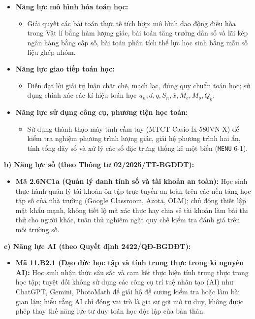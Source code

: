 \documentclass[12pt, a4paper]{article}
\begin{document}
\begin{itemize}[leftmargin=1.5em]
\begin{itemize}
        \item Tính toán chính xác các số đặc trưng đo xu thế trung tâm của mẫu số liệu ghép nhóm; đọc hiểu và nhận xét bảng số liệu thực tế.
        \item Rèn luyện kĩ năng phân bổ thời gian hợp lí khi làm bài kiểm tra trắc nghiệm kết hợp tự luận (tỉ lệ 70\% trắc nghiệm khách quan, 30\% tự luận).
    \end{itemize}
    \item \textbf{Năng lực mô hình hóa toán học:}
    \begin{itemize}
        \item Giải quyết các bài toán thực tế tích hợp: mô hình dao động điều hòa trong Vật lí bằng hàm lượng giác, bài toán tăng trưởng dân số và lãi kép ngân hàng bằng cấp số, bài toán phân tích thể lực học sinh bằng mẫu số liệu ghép nhóm.
    \end{itemize}
    \item \textbf{Năng lực giao tiếp toán học:}
    \begin{itemize}
        \item Diễn đạt lời giải tự luận chặt chẽ, mạch lạc, đúng quy chuẩn toán học; sử dụng chính xác các kí hiệu toán học $u_n, d, q, S_n, \overline{x}, M_e, M_o, Q_k$.
    \end{itemize}
    \item \textbf{Năng lực sử dụng công cụ, phương tiện học toán:}
    \begin{itemize}
        \item Sử dụng thành thạo máy tính cầm tay (MTCT Casio fx-580VN X) để kiểm tra nghiệm phương trình lượng giác, giải hệ phương trình hai ẩn, tính tổng dãy số và xử lý các số đặc trưng thống kê một biến (\texttt{MENU} 6-1).
    \end{itemize}
\end{itemize}

\textbf{b) Năng lực số (theo Thông tư 02/2025/TT-BGDĐT):}
\begin{itemize}[leftmargin=1.5em]
    \item \textbf{Mã 2.6NC1a (Quản lý danh tính số và tài khoản an toàn):} Học sinh thực hành quản lý tài khoản ôn tập trực tuyến an toàn trên các nền tảng học tập số của nhà trường (Google Classroom, Azota, OLM); chủ động thiết lập mật khẩu mạnh, không tiết lộ mã xác thực hay chia sẻ tài khoản làm bài thi thử cho người khác, tuân thủ nghiêm ngặt quy chế kiểm tra đánh giá trên môi trường số.
\end{itemize}

\textbf{c) Năng lực AI (theo Quyết định 2422/QĐ-BGDĐT):}
\begin{itemize}[leftmargin=1.5em]
    \item \textbf{Mã 11.B2.1 (Đạo đức học tập và tính trung thực trong kỉ nguyên AI):} Học sinh nhận thức sâu sắc và cam kết thực hiện tính trung thực trong học tập; tuyệt đối không sử dụng các công cụ trí tuệ nhân tạo (AI) như ChatGPT, Gemini, PhotoMath để giải hộ đề cương kiểm tra hoặc làm bài gian lận; hiểu rằng AI chỉ đóng vai trò là gia sư gợi mở tư duy, không được phép thay thế năng lực tư duy toán học độc lập của bản thân.
\end{itemize}
\end{document}
